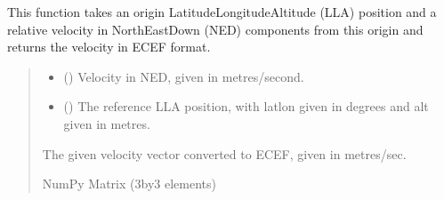 \documentclass[letterpaper,10pt,english]{sphinxmanual}
\begin{document}
\begin{fulllineitems}
\label{\detokenize{modules/util/transformations:qnav.util.transformations.vned2vecef}}
\pysigstartsignatures
{}
\pysigstopsignatures
\sphinxAtStartPar
This function takes an origin Latitude\sphinxhyphen{}Longitude\sphinxhyphen{}Altitude (LLA) position
and a relative velocity in North\sphinxhyphen{}East\sphinxhyphen{}Down (NED) components from this
origin and returns the velocity in ECEF format.
\begin{quote}\begin{description}
\begin{itemize}
\item {} 
\sphinxAtStartPar
{} (\sphinxstyleliteralemphasis{\sphinxupquote{ (}}\sphinxstyleliteralemphasis{\sphinxupquote{)}}) \textendash{} Velocity in NED, given in metres/second.

\item {} 
\sphinxAtStartPar
{} (\sphinxstyleliteralemphasis{\sphinxupquote{ (}}\sphinxstyleliteralemphasis{\sphinxupquote{)}}) \textendash{} The reference LLA position, with lat\sphinxhyphen{}lon given in degrees
and alt given in metres.

\end{itemize}

\sphinxAtStartPar
The given velocity vector converted to ECEF, given in metres/sec.

\sphinxAtStartPar
NumPy Matrix (3\sphinxhyphen{}by\sphinxhyphen{}3 elements)

\end{description}\end{quote}

\end{fulllineitems}

\end{document}
